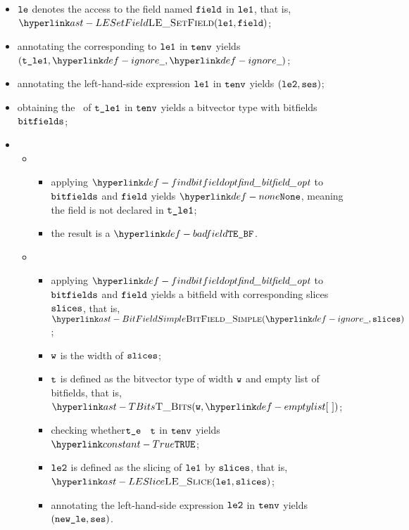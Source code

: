 \ProseParagraph
\AllApply
\begin{itemize}
  \item $\texttt{le}$ denotes the access to the field named $\texttt{field}$ in $\texttt{le1}$, that is, \\ $\LESetField(\vleone, \vfield)$;
  \item annotating the \rhsexpression{} corresponding to $\texttt{le1}$ in $\texttt{tenv}$ yields \\ $(\vtleone, \Ignore, \Ignore)$\ProseOrTypeError;
  \item annotating the left-hand-side expression $\texttt{le1}$ in $\texttt{tenv}$ yields $(\texttt{le2}, \texttt{ses})$\ProseOrTypeError;
  \item obtaining the \underlyingtype\ of $\texttt{t\_le1}$ in $\texttt{tenv}$ yields a bitvector type with bitfields $\texttt{bitfields}$\ProseOrTypeError;
  \item \OneApplies
  \begin{itemize}
    \item {}
    \begin{itemize}
      \item applying $\findbitfieldopt$ to $\texttt{bitfields}$ and $\texttt{field}$ yields $\None$, meaning the field is not declared
            in $\texttt{t\_le1}$;
      \item the result is a \typingerrorterm{} $\BadField$.
    \end{itemize}

    \item {}
    \begin{itemize}
      \item applying $\findbitfieldopt$ to $\texttt{bitfields}$ and $\texttt{field}$ yields a bitfield with corresponding slices $\texttt{slices}$,
            that is, $\BitFieldSimple(\Ignore, \slices)$;
      \item $\texttt{w}$ is the width of $\texttt{slices}$;
      \item $\texttt{t}$ is defined as the bitvector type of width $\texttt{w}$ and empty list of bitfields, that is, $\TBits(\vw, \emptylist)$;
      \item checking whether$\texttt{t\_e}$ \typesatisfies\ $\texttt{t}$ in $\texttt{tenv}$ yields $\True$\ProseOrTypeError;
      \item $\texttt{le2}$ is defined as the slicing of $\texttt{le1}$ by $\texttt{slices}$, that is, \\ $\LESlice(\vleone, \slices)$;
      \item annotating the left-hand-side expression $\texttt{le2}$ in $\texttt{tenv}$ yields \\ $(\texttt{new\_le}, \texttt{ses})$\ProseOrTypeError.
    \end{itemize}


\end{itemize}
\end{itemize}
